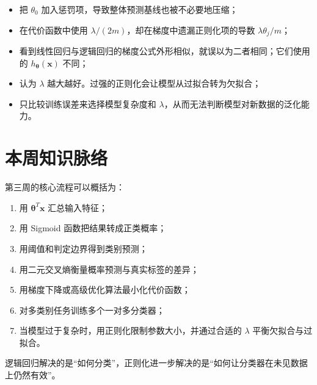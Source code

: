 \documentclass[12pt,a4paper]{ctexart}
\begin{document}
\begin{mistakebox}[正则化中的常见错误]
\begin{itemize}
  \item 把 $\theta_0$ 加入惩罚项，导致整体预测基线也被不必要地压缩；
  \item 在代价函数中使用 $\lambda/(2m)$，却在梯度中遗漏正则化项的导数 $\lambda\theta_j/m$；
  \item 看到线性回归与逻辑回归的梯度公式外形相似，就误以为二者相同；它们使用的 $h_{\boldsymbol{\theta}}(\mathbf{x})$ 不同；
  \item 认为 $\lambda$ 越大越好。过强的正则化会让模型从过拟合转为欠拟合；
  \item 只比较训练误差来选择模型复杂度和 $\lambda$，从而无法判断模型对新数据的泛化能力。
\end{itemize}
\end{mistakebox}

\section{本周知识脉络}

\begin{keybox}[从概率模型到泛化能力]
第三周的核心流程可以概括为：
\begin{enumerate}
  \item 用 $\boldsymbol{\theta}^{T}\mathbf{x}$ 汇总输入特征；
  \item 用 Sigmoid 函数把结果转成正类概率；
  \item 用阈值和判定边界得到类别预测；
  \item 用二元交叉熵衡量概率预测与真实标签的差异；
  \item 用梯度下降或高级优化算法最小化代价函数；
  \item 对多类别任务训练多个一对多分类器；
  \item 当模型过于复杂时，用正则化限制参数大小，并通过合适的 $\lambda$ 平衡欠拟合与过拟合。
\end{enumerate}
逻辑回归解决的是“如何分类”，正则化进一步解决的是“如何让分类器在未见数据上仍然有效”。
\end{keybox}
\end{document}
